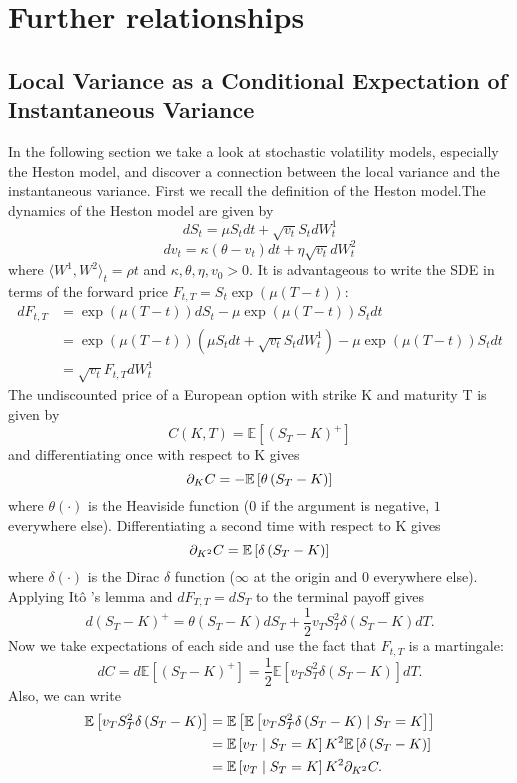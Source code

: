 \section{Further relationships}
\subsection{Local Variance as a Conditional Expectation of Instantaneous Variance}
In the following section we take a look at stochastic volatility models, especially the Heston model, and discover a connection between the local variance and the instantaneous variance. First we recall the definition of the Heston model.The dynamics of the Heston model are given by
$$dS_t = \mu S_tdt + \sqrt{v_t}S_tdW_t^1$$
$$dv_t = \kappa (\theta - v_t)dt
+ \eta\sqrt{v_t}dW_t^2$$
where $\langle W^1,W^2\rangle_t = \rho t$ and $\kappa , \theta , \eta , v_0 >0$. It is advantageous to write the SDE in terms of the forward price $F_{t,T} = S_t \exp{\left(\mu\left( T-t\right)\right)}$:
\begin{align*}
dF_{t,T} &=\exp{\left(\mu\left( T-t\right)\right)}dS_t-\mu\exp{\left(\mu\left( T-t\right)\right)}S_tdt\\
&=\exp{\left(\mu\left( T-t\right)\right)}\left(\mu S_tdt + \sqrt{v_t}S_tdW_t^1\right)-\mu\exp{\left(\mu\left( T-t\right)\right)}S_tdt\\
&= \sqrt{v_t} F_{t,T} dW_t^1
\end{align*}
The undiscounted price of a European option with strike K and maturity T is given by\\
$$ C ( K , T ) = \mathbb{E} \left[ \left( S_T -K\right) ^+\right] $$
and differentiating once with respect to K gives
$$ \partial_K C = -\mathbb{E}\left[\theta\left(S_T-K\right)\right]$$
where $\theta (\cdot)$ is the Heaviside function ($0$ if the argument is negative, $1$ everywhere else). Differentiating a second time with respect to K gives
$$ \partial_{K^2} C = \mathbb{E}\left[\delta\left(S_T-K\right)\right]$$
where $\delta (\cdot)$ is the Dirac $\delta$ function ($\infty $ at the origin and $0$ everywhere else). Applying It\^{o} 's lemma and $dF_{T,T}=dS_T $ to the terminal payoff gives
$$d\left( S_T-K\right)^+ = \theta\left( S_T-K\right) dS_T+\frac{1}{2}v_TS_T^2\delta\left( S_T-K\right) dT .$$
Now we take expectations of each side and use the fact that $F_{t,T}$ is a martingale:
$$dC=d\mathbb{E} \left[ \left( S_T -K\right) ^+\right] = \frac{1}{2}\mathbb{E}\left[ v_T S_T^2 \delta\left( S_T-K\right)\right] dT.$$
Also, we can write
\begin{align*}
\mathbb{E}\left[ v_T S_T^2 \delta\left( S_T-K\right)\right] &= \mathbb{E}\left[\mathbb{E}\left[ v_T S_T^2 \delta\left( S_T-K\right)\mid S_T = K \right]\right]\\
&=\mathbb{E}\left[v_T\mid S_T = K\right] K^2\mathbb{E}\left[\delta\left(S_T-K\right)\right]\\
&=\mathbb{E}\left[v_T\mid S_T = K\right] K^2\partial_{K^2} C.
\end{align*}
